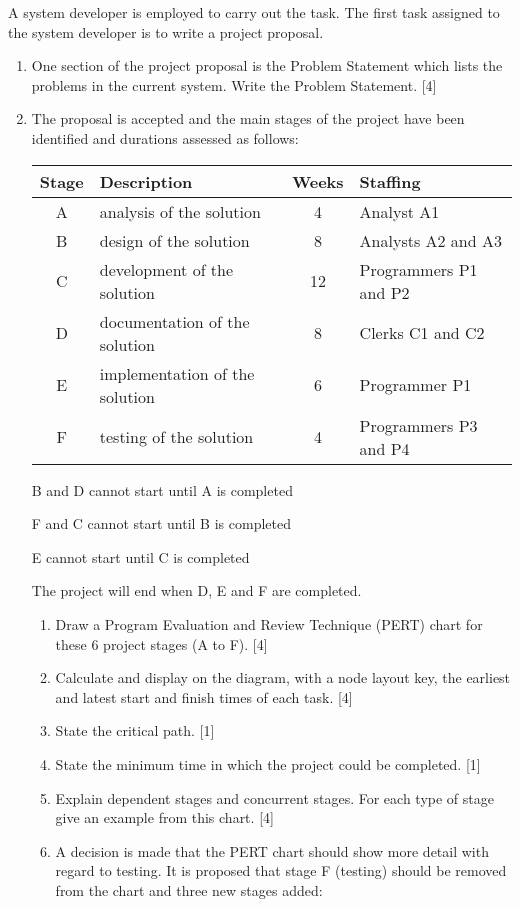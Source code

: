 A system developer is employed to carry out the task. The first task
assigned to the system developer is to write a project proposal.
\begin{enumerate}
\item One section of the project proposal is the Problem Statement which
lists the problems in the current system. Write the Problem Statement.\hfill{}
{[}4{]}
\item The proposal is accepted and the main stages of the project have been
identified and durations assessed as follows: 

\begin{tabular}{|c|l|c|l|}
\hline 
Stage & Description & Weeks & Staffing\tabularnewline
\hline 
\hline 
A & analysis of the solution & 4 & Analyst A1\tabularnewline
\hline 
B & design of the solution & 8 & Analysts A2 and A3 \tabularnewline
\hline 
C & development of the solution & 12 & Programmers P1 and P2\tabularnewline
\hline 
D & documentation of the solution & 8 & Clerks C1 and C2\tabularnewline
\hline 
E & implementation of the solution & 6 & Programmer P1\tabularnewline
\hline 
F & testing of the solution & 4 & Programmers P3 and P4\tabularnewline
\hline 
\end{tabular}

B and D cannot start until A is completed 

F and C cannot start until B is completed 

E cannot start until C is completed 

The project will end when D, E and F are completed.
\begin{enumerate}
\item Draw a Program Evaluation and Review Technique (PERT) chart for these
6 project stages (A to F). \hfill{}{[}4{]}
\item Calculate and display on the diagram, with a node layout key, the
earliest and latest start and finish times of each task. \hfill{}{[}4{]}
\item State the critical path.\hfill{} {[}1{]}
\item State the minimum time in which the project could be completed. \hfill{}{[}1{]}
\item Explain dependent stages and concurrent stages. For each type of stage
give an example from this chart. \hfill{}{[}4{]}
\item A decision is made that the PERT chart should show more detail with
regard to testing. It is proposed that stage F (testing) should be
removed from the chart and three new stages added:


\end{enumerate}
\end{enumerate}
